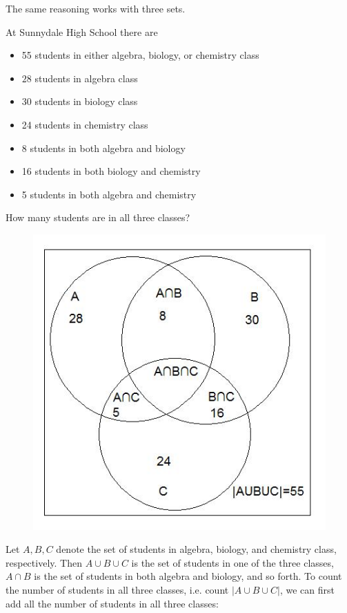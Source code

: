 The same reasoning works with three sets.
\begin{ex}
At Sunnydale High School there are
\begin{itemize}
\item 55 students in either algebra, biology, or chemistry class
\item $28$ students in algebra class
\item 30 students in biology class
\item 24 students in chemistry class
\item 8 students in both algebra and biology
\item 16 students in both biology and chemistry
\item 5 students in both algebra and chemistry
\end{itemize}
How many students are in all three classes?
\end{ex}
\begin{figure}[h!]
\centering
\includegraphics{venn}\\
\end{figure}
 Let $A,B,C$ denote the set of students in algebra, biology, and chemistry class, respectively. Then $A\cup B\cup C$ is the set of students in one of the three classes, $A\cap B$ is the set of students in both algebra and biology, and so forth. To count the number of students in all three classes, i.e. count $|A\cup B\cup C|$, we can first add all the number of students in all three classes:

